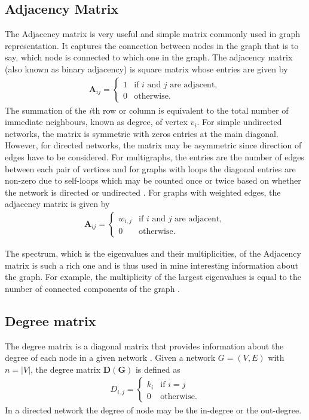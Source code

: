 \documentclass[10pt,a4paper]{article}
\begin{document}
\subsection{Adjacency Matrix}
The Adjacency matrix is very useful and simple matrix commonly used in graph representation. It captures the connection between nodes in the graph that is to say, which node is connected to which one in the graph. The adjacency matrix (also known as binary adjacency) is square matrix whose entries are given by
\begin{eqnarray}
\mathbf{A}_{ij} = \begin{cases} 1 &\mbox{if } i \text{ and } j \text{ are adjacent}, \\
0 & \text{otherwise}.
\end{cases}
\end{eqnarray}
The summation of the $i$th row or column is equivalent to the total number of immediate neighbours, known as degree, of  vertex $v_i$. For simple undirected networks, the matrix is symmetric with zeros entries at the main diagonal. However, for directed networks, the matrix may be asymmetric since direction of edges have to be considered. For multigraphs, the entries  are the number of edges between each pair of vertices and for graphs with loops the diagonal entries are non-zero due to self-loops which may be counted once or twice based on whether the network is directed or undirected \citep{biggs1993algebraic,godsil2001algebraic}. For graphs with weighted edges, the adjacency matrix is given by 
\begin{eqnarray}
\mathbf{A}_{ij} = \begin{cases} w_{i,j} &\mbox{if } i \text{ and } j \text{ are adjacent}, \\
0 & \text{otherwise}.
\end{cases}
\end{eqnarray}


The spectrum, which is the eigenvalues and their multiplicities, of the Adjacency matrix is such a rich one and is thus used in mine interesting information about the graph. For example, the multiplicity of the largest eigenvalues is equal to the number of connected components of the graph \citep{cvetkovic2004spectral}. 

\subsection{Degree matrix}
	The degree matrix is a diagonal matrix that provides information about the degree of each node in a given network \citep{newman2010networks}. Given a network $G=(V,E)$ with $n=|V|$, the degree matrix $\mathbf{D(G)}$ is defined as
	\begin{eqnarray}
	D_{i,j} =  \begin{cases} k_i &\mbox{if } i = j \\
	0 & \text{otherwise}.
	\end{cases}
	\end{eqnarray}
	In a directed network the degree of node may be the in-degree or the out-degree.
\end{document}
